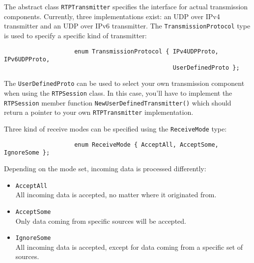 \documentclass[12pt,a4paper]{article}
\begin{document}
				The abstract class {\tt RTPTransmitter} specifies the interface for
				actual transmission components. Currently, three implementations exist:
				an UDP over IPv4 transmitter and an UDP over IPv6 transmitter. 
				The {\tt TransmissionProtocol} type 
				is used to specify a specific kind of transmitter:
				\begin{verbatim}
					enum TransmissionProtocol { IPv4UDPProto, IPv6UDPProto, 
					                            UserDefinedProto };
				\end{verbatim}
				The {\tt UserDefinedProto} can be used to select your own transmission
				component when using the {\tt RTPSession} class. In this case, you'll
				have to implement the {\tt RTPSession} member function 
				{\tt NewUserDefinedTransmitter()} which should return a pointer to your
				own {\tt RTPTransmitter} implementation.

				Three kind of receive modes can be specified using the {\tt ReceiveMode}
				type:
				\begin{verbatim}
					enum ReceiveMode { AcceptAll, AcceptSome, IgnoreSome };
				\end{verbatim}
				Depending on the mode set, incoming data is processed differently:
				\begin{itemize}
					\item {\tt AcceptAll}\\
						All incoming data is accepted, no matter where it originated
						from.
					\item {\tt AcceptSome}\\
						Only data coming from specific sources will be accepted.
					\item {\tt IgnoreSome}\\
						All incoming data is accepted, except for data coming from
						a specific set of sources.
				\end{itemize}
				
\end{document}
